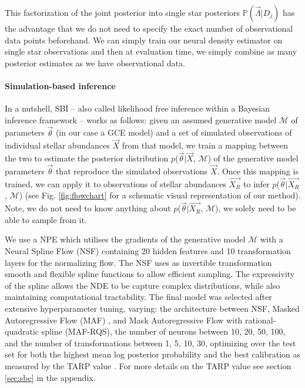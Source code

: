 \documentclass{aa}
\begin{document}
This factorization of the joint posterior into single star posteriors $\mathbb{P}(\vec\Lambda|D_j)$ has the advantage that we do not need to specify the exact number of observational data points beforehand. We can simply train our neural density estimator on single star observations and then at evaluation time, we simply combine as many posterior estimates as we have observational data.


\paragraph{Simulation-based inference}
In a nutshell, SBI \citep[e.g.][]{Cranmer2020,Papamakarios:2021,Gloeckler2024AllinoneSI} -- also called likelihood free inference within a Bayesian inference framework -- works as follows: given an assumed generative model $\mathcal{M}$ of parameters $\Vec{\theta}$ (in our case a GCE model) and a set of simulated observations of individual stellar abundances $\Vec{X}$ from that model, we train a mapping between the two to estimate the posterior distribution $p$($\Vec{\theta}|\Vec{X}$, $\mathcal{M}$) of the generative model parameters $\Vec{\theta}$ that reproduce the simulated observations $\Vec{X}$. Once this mapping is trained, we can apply it to observations of stellar abundances $\Vec{X_R}$ to infer $p$($\Vec{\theta}|\Vec{X_R}$, $\mathcal{M}$) (see Fig. \ref{fig:flowchart} for a schematic visual representation of our method). Note, we do not need to know anything about $p$($\Vec{\theta}|\Vec{X_R}$, $\mathcal{M}$), we solely need to be able to sample from it.

We use a NPE \cite{zeghal2022neuralposteriorestimationdifferentiable} which utilises the gradients of the generative model $\mathcal{M}$ with a Neural Spline Flow (NSF) \citet{durkan2019neuralsplineflows} containing 20 hidden features and 10 transformation layers for the normalizing flow. The NSF uses as invertible transformation smooth and flexible spline functions to allow efficient sampling. The expressivity of the spline allows the NDE to be capture complex distributions, while also maintaining computational tractability. The final model was selected after extensive hyperparameter tuning, varying: the architecture between NSF, Masked Autoregressive Flow (MAF) \cite{papamakarios2018maskedautoregressiveflowdensity}, and Mask Autoregressive 
Flow with rational-quadratic spline (MAF-RQS), the number of neurons between {10, 20, 50, 100}, and the number of transformations between {1, 5, 10, 30}, optimizing over the test set for both the highest mean log posterior probability and the best calibration as measured by the TARP value \citep{Lemos2023}. For more details on the TARP value see section \ref{sec:sbc} in the appendix.
\end{document}
